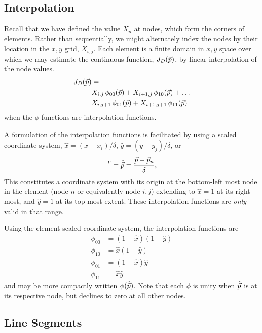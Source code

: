 \subsection{Interpolation}\label{sec:interpolate}

Recall that we have defined the value $X_n$ at nodes, which form the corners of elements.  Rather than sequentially, we might alternately index the nodes by their location in the $x,y$ grid, $X_{i,j}$.  Each element is a finite domain in $x,y$ space over which we may estimate the continuous function, $J_D(\vec{p})$, by linear interpolation of the node values.  
\begin{align}
J_D(\vec{p}) &= \nonumber\\
 &X_{i,j}\,\phi_{00} (\vec{p}) + X_{i+1,j}\,\phi_{10} (\vec{p}) + \dots\nonumber\\
 &X_{i,j+1}\,\phi_{01} (\vec{p}) + X_{i+1,j+1}\,\phi_{11} (\vec{p})
\end{align}
when the $\phi$ functions are interpolation functions.  

A formulation of the interpolation functions is facilitated by using a scaled coordinate system, $\hat{x} = (x-x_i) / \delta$, $\hat{y} = (y-y_j)/\delta$, or
\begin{align}
[\hat{x}, \hat{y}]^T = \hat{\p} = \frac{\p - \p_n}{\delta},
\end{align}
This constitutes a coordinate system with its origin at the bottom-left most node in the element (node $n$ or equivalently node $i,j$) extending to $\hat{x}=1$ at its right-most, and $\hat{y} = 1$ at its top most extent.  These interpolation functions are \emph{only} valid in that range.

Using the element-scaled coordinate system, the interpolation functions are
\begin{subequations}
\begin{align}
\phi_{00} &= (1-\hat{x})(1-\hat{y})\\
\phi_{10} &= \hat{x}(1-\hat{y})\\
\phi_{01} &= (1-\hat{x})\hat{y}\\
\phi_{11} &= \hat{x}\hat{y}
\end{align}
\end{subequations}
and may be more compactly written $\phi(\hat{\vec{p}})$.  Note that each $\phi$ is unity when $\hat{\vec{p}}$ is at its respective node, but declines to zero at all other nodes.

\subsection{Line Segments}\label{sec:segments}

